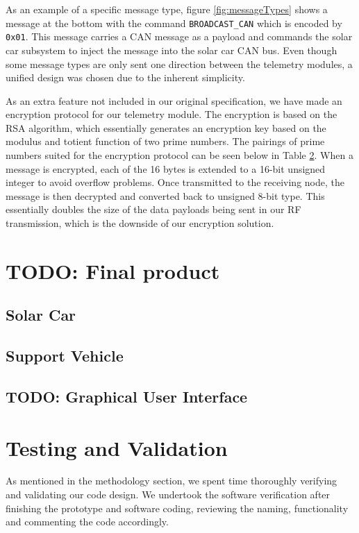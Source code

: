 \documentclass[conference]{IEEEtran}
\newcommand{\todo}[1]{{\color{olive} TODO: #1}}
\begin{document}
As an example of a specific message type, figure \ref{fig:messageTypes} shows a message at the bottom with the command \texttt{BROADCAST\_CAN} which is encoded by \texttt{0x01}. This message carries a CAN message as a payload and commands the solar car subsystem to inject the message into the solar car CAN bus. Even though some message types are only sent one direction between the telemetry modules, a unified design was chosen due to the inherent simplicity.

As an extra feature not included in our original specification, we have made an encryption protocol for our telemetry module. The encryption is based on the RSA algorithm, which essentially generates an encryption key based on the modulus and totient function of two prime numbers. The pairings of prime numbers suited for the encryption protocol can be seen below in Table \ref{}. When a message is encrypted, each of the 16 bytes is extended to a 16-bit unsigned integer to avoid overflow problems. Once transmitted to the receiving node, the message is then decrypted and converted back to unsigned 8-bit type. This essentially doubles the size of the data payloads being sent in our RF transmission, which is the downside of our encryption solution.



\section{\todo{Final product}}
\subsection{Solar Car}
\subsection{Support Vehicle}
\subsection{\todo{Graphical User Interface}}


\section{Testing and Validation} %
As mentioned in the methodology section, we spent time thoroughly verifying and validating our code design. We undertook the software verification after finishing the prototype and software coding, reviewing the naming, functionality and commenting the code accordingly.
\end{document}
